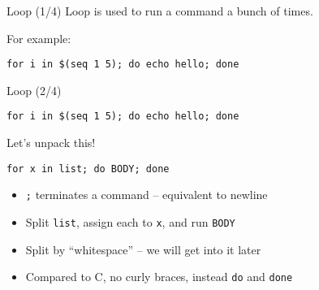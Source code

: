 \documentclass[12pt]{beamer}
\begin{document}
\begin{frame}[fragile]{Loop (1/4)}
  Loop is used to run a command a bunch of times.

  For example:
  \begin{verbatim}
for i in $(seq 1 5); do echo hello; done
\end{verbatim}
\end{frame}

\begin{frame}[fragile]{Loop (2/4)}
  \begin{verbatim}
for i in $(seq 1 5); do echo hello; done
\end{verbatim}
  Let's unpack this!

  \texttt{for x in list; do BODY; done}
  \begin{itemize}
    \item \texttt{;} terminates a command -- equivalent to newline
    \item Split \texttt{list}, assign each to \texttt{x}, and run \texttt{BODY}
    \item Split by ``whitespace'' -- we will get into it later
    \item Compared to C, no curly braces, instead \texttt{do} and \texttt{done}
  \end{itemize}
\end{frame}


\end{document}
